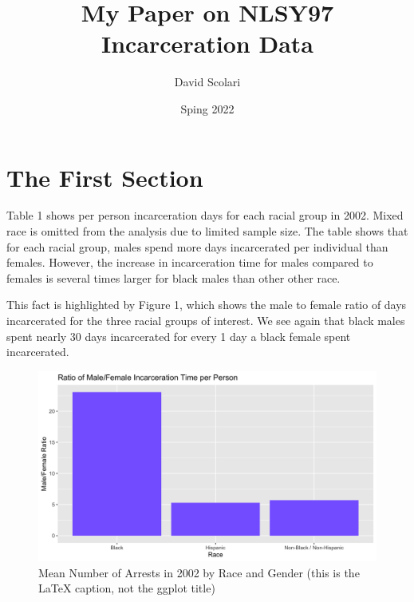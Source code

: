\documentclass{article}
\author{David Scolari}
\title{My Paper on NLSY97 Incarceration Data}
\date{Sping 2022}
\begin{document}
\maketitle

\section{The First Section}



Table 1 shows per person incarceration days for each racial group in 2002. Mixed race is omitted from the analysis due to limited sample size. The table shows that for each racial group, males spend more days incarcerated per individual than females. However, the increase in incarceration time for males compared to females is several times larger for black males than other other race.

This fact is highlighted by Figure 1, which shows the male to female ratio of days incarcerated for the three racial groups of interest. We see again that black males spent nearly 30 days incarcerated for every 1 day a black female spent incarcerated.  


\begin{figure}[H]
    \begin{center}
        \includegraphics[width=.85\textwidth]{../figures/inc_bar.png}
    \end{center}
    \caption{Mean Number of Arrests in 2002 by Race and Gender (this is the LaTeX caption, not the ggplot title)}
    \label{fig:graph}
\end{figure}




\end{document}
